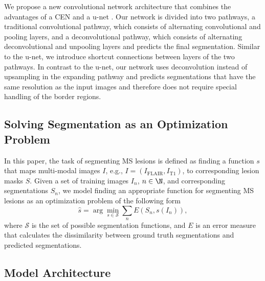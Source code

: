 We propose a new convolutional network architecture that combines the advantages
of a CEN \cite{brosch2015} and a u-net \cite{ronneberger2015}. Our network is
divided into two pathways, a traditional convolutional pathway, which consists
of alternating convolutional and pooling layers, and a deconvolutional pathway,
which consists of alternating deconvolutional and unpooling layers and predicts
the final segmentation. Similar to the u-net, we introduce shortcut connections
between layers of the two pathways. In contrast to the u-net, our network uses
deconvolution instead of upsampling in the expanding pathway and predicts
segmentations that have the same resolution as the input images and therefore
does not require special handling of the border regions.

\subsection{Solving Segmentation as an Optimization Problem}

In this paper, the task of segmenting MS lesions is defined as finding a
function $s$ that maps multi-modal images $I$, e.g., $I = (I_\text{FLAIR},
I_\text{T1})$, to corresponding lesion masks $S$. Given a set of
training images $I_n$, $n \in \N$, and corresponding segmentations $S_n$, we
model finding an appropriate function for segmenting MS lesions as an
optimization problem of the following form
\begin{equation}
\hat{s} = \arg \min_{s \in \mathcal{S}} \sum_n E(S_n, s(I_n)),
\label{eq:segprob}
\end{equation}
where $\mathcal{S}$ is the set of possible segmentation functions, and $E$ is an
error measure that calculates the dissimilarity between ground truth
segmentations and predicted segmentations.

\subsection{Model Architecture}


